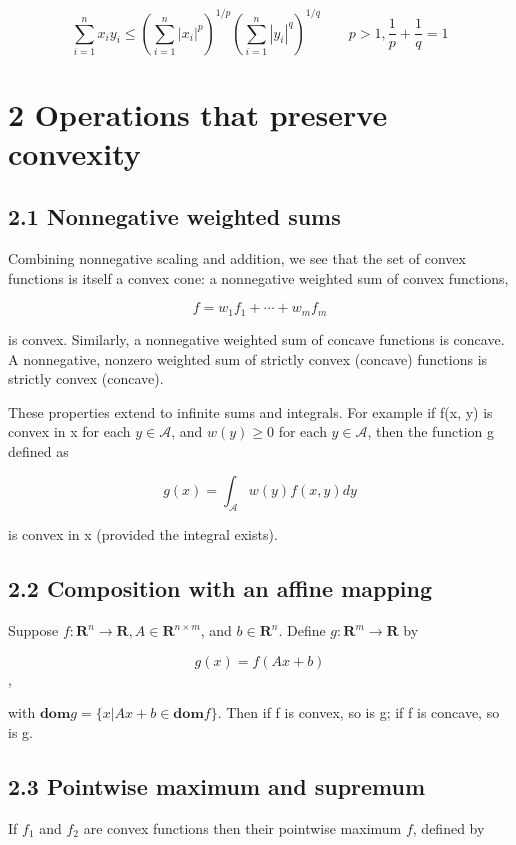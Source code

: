 \documentclass{article}
\begin{document}
\[
    \sum_{i=1}^nx_iy_i\le(\sum_{i=1}^n|x_i|^p)^{1/p}(\sum_{i=1}^n|y_i|^q)^{1/q} \qquad p>1,\frac{1}{p}+\frac{1}{q}=1
\]

\section*{2 Operations that preserve convexity}

\subsection*{2.1 Nonnegative weighted sums}

Combining nonnegative scaling and addition, we see that the set of convex functions is itself a
convex cone: a nonnegative weighted sum of convex functions,

\[
f=w_1f_1+\cdots+w_mf_m    
\]

is convex. Similarly, a nonnegative weighted sum of concave functions is concave. A
nonnegative, nonzero weighted sum of strictly convex (concave) functions is strictly
convex (concave).

These properties extend to infinite sums and integrals. For example if f(x, y)
is convex in x for each $y \in \mathcal{A}$, and $w(y) \ge 0$ for each $y \in \mathcal{A}$, then the function g
defined as

\[
g(x)=\int_{\mathcal{A}} w(y)f(x,y)dy    
\]

is convex in x (provided the integral exists).

\subsection*{2.2 Composition with an affine mapping}

Suppose $f:\mathbf{R}^n \rightarrow \mathbf{R}, A \in \mathbf{R}^{n\times m}$, and $b \in \mathbf{R}^n$. Define $g: \mathbf{R}^m \rightarrow \mathbf{R}$ by

\[
    g(x) = f(Ax + b)
\],

with $\mathbf{dom} g = \{x | Ax + b \in \mathbf{dom}f\}$. Then if f is convex, so is g; if f is concave,
so is g.

\subsection*{2.3 Pointwise maximum and supremum}

If $f_1$ and $f_2$ are convex functions then their pointwise maximum $f$, defined by
\end{document}
